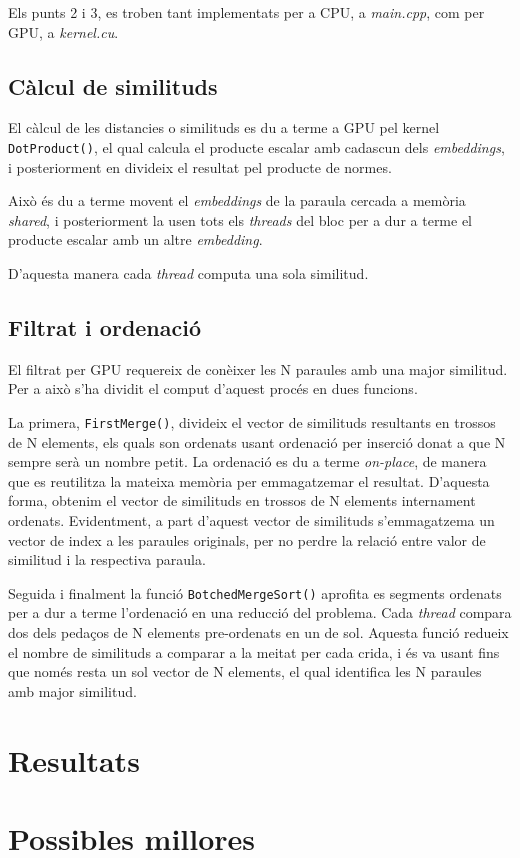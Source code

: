 \documentclass[catalan,10pt,a4paper]{article}
\begin{document}
	Els punts 2 i 3, es troben tant implementats per a CPU, a \textit{main.cpp}, com per GPU, a \textit{kernel.cu}.
	
	\subsection*{Càlcul de similituds}
	El càlcul de les distancies o similituds es du a terme a GPU pel kernel \verb|DotProduct()|, el qual calcula el producte escalar amb cadascun dels \textit{embeddings}, i posteriorment en divideix el resultat pel producte de normes.
	
	Això és du a terme movent el \textit{embeddings} de la paraula cercada a memòria \textit{shared}, i posteriorment la usen tots els \textit{threads} del bloc per a dur a terme el producte escalar amb un altre \textit{embedding}.
	
	D'aquesta manera cada \textit{thread} computa una sola similitud.
	
	\subsection*{Filtrat i ordenació}
	El filtrat per GPU requereix de conèixer les N paraules amb una major similitud. Per a això s'ha dividit el comput d'aquest procés en dues funcions.
	
	La primera, \verb|FirstMerge()|, divideix el vector de similituds resultants en trossos de N elements, els quals son ordenats usant ordenació per inserció donat a que N sempre serà un nombre petit. La ordenació es du a terme \textit{on-place}, de manera que es reutilitza la mateixa memòria per emmagatzemar el resultat.\newline
	D'aquesta forma, obtenim el vector de similituds en trossos de N elements internament ordenats. Evidentment, a part d'aquest vector de similituds s'emmagatzema un vector de index a les paraules originals, per no perdre la relació entre valor de similitud i la respectiva paraula.
	
	Seguida i finalment la funció \verb|BotchedMergeSort()| aprofita es segments ordenats per a dur a terme l'ordenació en una reducció del problema. Cada \textit{thread} compara dos dels pedaços de N elements pre-ordenats en un de sol.\newline
	Aquesta funció redueix el nombre de similituds a comparar a la meitat per cada crida, i és va usant fins que només resta un sol vector de N elements, el qual identifica les N paraules amb major similitud.
	
	
	\section*{Resultats}
	
	\section*{Possibles millores}
\end{document}
